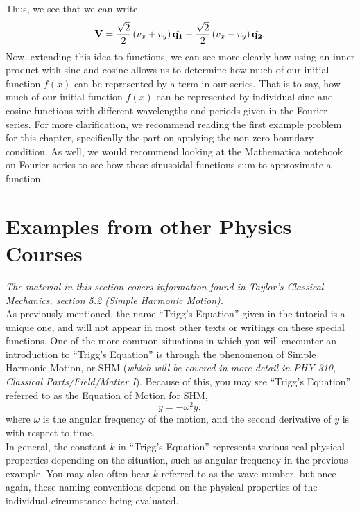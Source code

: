 \documentclass[11pt]{report}
\newcommand{\fpar}[1]{\left({#1}\right)}
\begin{document}
Thus, we see that we can write
    \[\bold{V} = \frac{\sqrt{2}}{2}\fpar{v_x+v_y}\hat{\bold{q_1}}+\frac{\sqrt{2}}{2}\fpar{v_x-v_y}\hat{\bold{q_2}}.\]
Now, extending this idea to functions, we can see more clearly how using an inner product with sine and cosine allows us to determine how much of our initial function $f(x)$ can be represented by a term in our series. That is to say, how much of our initial function $f(x)$ can be represented by individual sine and cosine functions with different wavelengths and periods given in the Fourier series. For more clarification, we recommend reading the first example problem for this chapter, specifically the part on applying the non zero boundary condition. As well, we would recommend looking at the Mathematica notebook on Fourier series to see how these sinusoidal functions sum to approximate a function.



\section{Examples from other Physics Courses}

\emph{The material in this section covers information found in Taylor's Classical Mechanics, section 5.2 (Simple Harmonic Motion).}\\

As previously mentioned, the name ``Trigg's Equation'' given in the tutorial is a unique one, and will not appear in most other texts or writings on these special functions. One of the more common situations in which you will encounter an introduction to ``Trigg's Equation'' is through the phenomenon of Simple Harmonic Motion, or SHM (\emph{which will be covered in more detail in PHY 310, Classical Parts/Field/Matter I}). Because of this, you may see ``Trigg's Equation'' referred to as the Equation of Motion for SHM,
\begin{equation*}
    \ddot{y} = -\omega^2y,
\end{equation*}
where $\omega$ is the angular frequency of the motion, and the second derivative of $y$ is with respect to time.\\

In general, the constant $k$ in ``Trigg's Equation'' represents various real physical properties depending on the situation, such as angular frequency in the previous example. You may also often hear $k$ referred to as the wave number, but once again, these naming conventions depend on the physical properties of the individual circumstance being evaluated.\\
\end{document}
